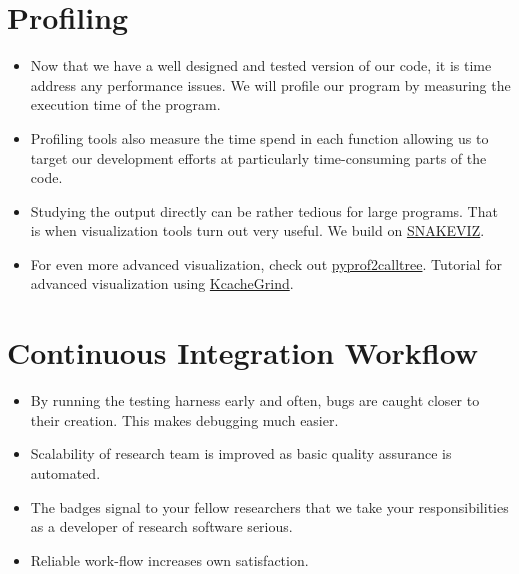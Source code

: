 \section{Profiling}
\begin{itemize}
\item Now that we have a well designed and tested version of our code, it is time address any performance issues. We will profile our program by measuring the execution time of the program. 
\item Profiling tools also measure the time spend in each function allowing us to target our development efforts at particularly time-consuming parts of the code.
\item Studying the output directly can be rather tedious for large programs. That is when visualization tools turn out very useful. We build on \href{http://jiffyclub.github.io/snakeviz}{SNAKEVIZ}.
\item For even more advanced visualization, check out \href{https://github.com/pwaller/pyprof2calltree}{pyprof2calltree}. Tutorial for advanced visualization using \href{http://bit.ly/1SaXJgM}{KcacheGrind}.
\end{itemize}


\section{Continuous Integration Workflow}
\begin{itemize}
\item By running the testing harness early and often, bugs are caught closer to their creation. This makes debugging much easier. 
\item Scalability of research team is improved as basic quality assurance is automated.
\item The badges signal to your fellow researchers that we take your responsibilities as a developer of research software serious.
\item  Reliable work-flow increases own satisfaction.
\end{itemize}

